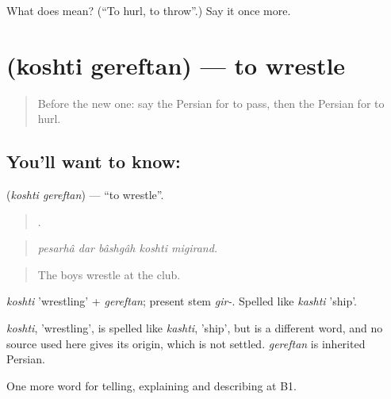 \begin{tcolorbox}[breakable,colback=teal!4,colframe=teal!35!black,title={Before you move on}]
What does   mean? (\textquotedblleft{}To hurl, to throw\textquotedblright{}.) Say it once more.
\end{tcolorbox}
\section[\texorpdfstring{\fa{کشتی} \fa{گرفتن} (koshti gereftan)}{کشتی گرفتن (koshti gereftan)}]{  (koshti gereftan) — to wrestle}

\label{lesson:FA-C515-koshti-gereftan}



\begin{quote}
Before the new one: say the Persian for to pass, then the Persian for to hurl.
\end{quote}

\subsection*{You'll want to know:  }
\textbf{ } (\emph{koshti gereftan}) — \textquotedblleft{}to wrestle\textquotedblright{}.

\begin{quote}
    .
\end{quote}

\begin{quote}
\emph{pesarhâ dar bâshgâh koshti migirand.}
\end{quote}

\begin{quote}
The boys wrestle at the club.
\end{quote}

\emph{koshti} 'wrestling' + \emph{gereftan}; present stem \emph{gir-}. Spelled like \emph{kashti} 'ship'.

\begin{cousinweb}
\emph{koshti}, 'wrestling', is spelled like \emph{kashti}, 'ship', but is a different word, and no source used here gives its origin, which is not settled. \emph{gereftan} is inherited Persian.
\end{cousinweb}

\begin{grammarlens}[title={What you've built}]
One more word for telling, explaining and describing at B1.
\end{grammarlens}

